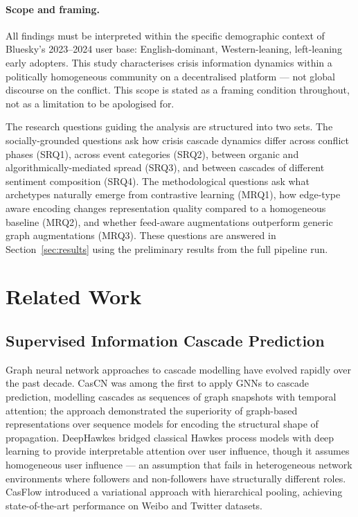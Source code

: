 \documentclass[12pt, a4paper]{article}
\begin{document}
\paragraph{Scope and framing.} All findings must be interpreted within the specific demographic context of Bluesky's 2023--2024 user base: English-dominant, Western-leaning, left-leaning early adopters. This study characterises crisis information dynamics within a politically homogeneous community on a decentralised platform --- not global discourse on the conflict. This scope is stated as a framing condition throughout, not as a limitation to be apologised for.

The research questions guiding the analysis are structured into two sets. The socially-grounded questions ask how crisis cascade dynamics differ across conflict phases (SRQ1), across event categories (SRQ2), between organic and algorithmically-mediated spread (SRQ3), and between cascades of different sentiment composition (SRQ4). The methodological questions ask what archetypes naturally emerge from contrastive learning (MRQ1), how edge-type aware encoding changes representation quality compared to a homogeneous baseline (MRQ2), and whether feed-aware augmentations outperform generic graph augmentations (MRQ3). These questions are answered in Section~\ref{sec:results} using the preliminary results from the full pipeline run.

\section{Related Work}
\label{sec:related}

\subsection{Supervised Information Cascade Prediction}

Graph neural network approaches to cascade modelling have evolved rapidly over the past decade. CasCN \citep{chen2019cascn} was among the first to apply GNNs to cascade prediction, modelling cascades as sequences of graph snapshots with temporal attention; the approach demonstrated the superiority of graph-based representations over sequence models for encoding the structural shape of propagation. DeepHawkes \citep{cao2017deephawkes} bridged classical Hawkes process models with deep learning to provide interpretable attention over user influence, though it assumes homogeneous user influence --- an assumption that fails in heterogeneous network environments where followers and non-followers have structurally different roles. CasFlow \citep{yuan2024casflow} introduced a variational approach with hierarchical pooling, achieving state-of-the-art performance on Weibo and Twitter datasets.
\end{document}
